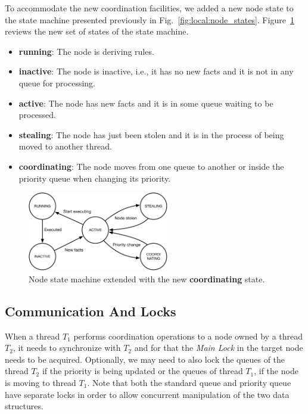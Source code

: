 To accommodate the new coordination facilities, we added a new node state to the
state machine presented previously in Fig.~\ref{fig:local:node_states}.
Figure~\ref{fig:implementation:node_states} reviews the new set of states of
the state machine.

\begin{itemize}
   \item \textbf{running}: The node is deriving rules.
   \item \textbf{inactive}: The node is inactive, i.e., it has no new facts and
      it is not in any
   queue for processing.
   \item \textbf{active}: The node has new facts and it is in some queue waiting
   to be processed.
   \item \textbf{stealing}: The node has just been stolen and it is in the process of being
   moved to another thread.
   \item \textbf{coordinating}: The node moves from one queue to another or
      inside the priority queue when changing its priority.
\end{itemize}

\begin{figure}[ht]
   \centering
   \includegraphics[width=0.55\textwidth]{figures/implementation/node_states.pdf}
   \caption{Node state machine extended with the new \textbf{coordinating}
   state.}
   \label{fig:implementation:node_states}
\end{figure}

\subsection{Communication And Locks}

When a thread $T_1$ performs coordination operations to a node owned by a thread
$T_2$, it needs to synchronize with $T_2$ and for that the \emph{Main Lock} in
the target node needs to be acquired. Optionally, we may need to also lock the
queues of the thread $T_2$ if the priority is being updated or the queues of
thread $T_1$, if the node is moving to thread $T_1$. Note that both the standard
queue and priority queue have separate locks in order to allow concurrent
manipulation of the two data structures.

